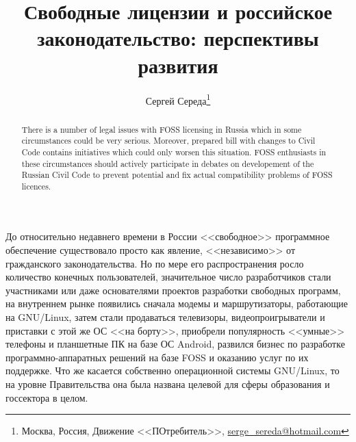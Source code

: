 \documentclass[10pt, a5paper]{article}
\begin{document}
\title{Свободные лицензии и российское законодательство: перспективы развития}
\author{Сергей Середа\footnote{Москва, Россия, Движение <<ПОтребитель>>, \url{serge_sereda@hotmail.com}}}
\date{}
\maketitle

\begin{abstract}
There is a number of legal issues with FOSS licensing in Russia which in some circumstances could be very serious. Moreover, prepared bill with changes to Civil Code contains initiatives which could only worsen this situation. FOSS enthusiasts in these circumstances should actively participate in debates on developement of the Russian Civil Code to prevent potential and fix actual compatibility problems of FOSS licences.
\end{abstract}

 До относительно недавнего времени в России <<свободное>> программное обеспечение существовало просто как явление, <<независимо>> от гражданского законодательства. Но по мере его распространения росло количество конечных пользователей, значительное число разработчиков стали участниками или даже основателями проектов разработки свободных программ, на внутреннем рынке появились сначала модемы и маршрутизаторы, работающие на GNU/Linux, затем стали продаваться телевизоры, видеопроигрыватели и приставки с этой же ОС <<на борту>>, приобрели популярность <<умные>> телефоны и планшетные ПК на базе ОС Android, развился бизнес по разработке программно-аппаратных решений на базе FOSS и оказанию услуг по их поддержке. Что же касается собственно операционной системы GNU/Linux, то на уровне Правительства она была названа целевой для сферы образования и госсектора в целом. 
\end{document}
